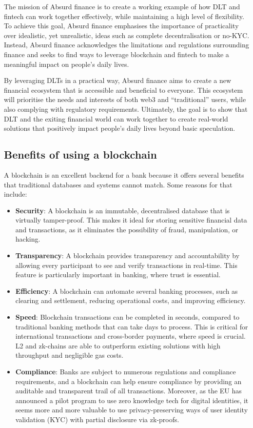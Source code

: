 \documentclass[a4paper,10 pt]{article}
\theoremstyle{definition}
\begin{document}
The mission of Absurd finance is to create a working example of how DLT and fintech can work together effectively, while maintaining a high level of flexibility. To achieve this goal, Absurd finance emphasises the importance of practicality over idealistic, yet unrealistic, ideas such as complete decentralisation or no-KYC. Instead, Absurd finance acknowledges the limitations and regulations surrounding finance and seeks to find ways to leverage blockchain and fintech to make a meaningful impact on people's daily lives.  

By leveraging DLTs in a practical way, Absurd finance aims to create a new financial ecosystem that is accessible and beneficial to everyone. This ecosystem will prioritise the needs and interests of both web3 and “traditional” users, while also complying with regulatory requirements. Ultimately, the goal is to show that DLT and the exiting financial world can work together to create real-world solutions that positively impact people's daily lives beyond basic speculation.

\subsection{Benefits of using a blockchain}
A blockchain is an excellent backend for a bank because it offers several benefits that traditional databases and systems cannot match. Some reasons for that include:  

\begin{itemize}
\item {\bf Security}: A blockchain is an immutable, decentralised database that is virtually tamper-proof. This makes it ideal for storing sensitive financial data and transactions, as it eliminates the possibility of fraud, manipulation, or hacking. 
\item {\bf Transparency}: A blockchain provides transparency and accountability by allowing every participant to see and verify transactions in real-time. This feature is particularly important in banking, where trust is essential. 
\item {\bf Efficiency}: A blockchain can automate several banking processes, such as clearing and settlement, reducing operational costs, and improving efficiency. 
\item {\bf Speed}: Blockchain transactions can be completed in seconds, compared to traditional banking methods that can take days to process. This is critical for international transactions and cross-border payments, where speed is crucial. L2 and zk-chains are able to outperform existing solutions with high throughput and negligible gas costs.
\item {\bf Compliance}: Banks are subject to numerous regulations and compliance requirements, and a blockchain can help ensure compliance by providing an auditable and transparent trail of all transactions. Moreover, as the EU has announced a pilot program to use zero knowledge tech for digital identities, it seems more and more valuable to use privacy-preserving ways of user identity validation (KYC) with partial disclosure via zk-proofs.
\end{itemize}
\end{document}
